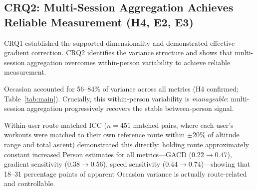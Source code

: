 \documentclass[times, twoside]{zHenriquesLab-StyleBioRxiv}
\begin{document}
\subsection*{CRQ2: Multi-Session Aggregation Achieves Reliable Measurement (H4, E2, E3)}

CRQ1 established the supported dimensionality and demonstrated effective gradient correction. CRQ2 identifies the variance structure and shows that multi-session aggregation overcomes within-person variability to achieve reliable measurement.

\begin{table}[ht]
\centering
\small
\caption{Reliability of DI and the GACD-derived metrics. $\beta_{\text{time}}$, $\beta_{\text{grad}}$, and $\beta_{\text{speed}}$ are derived from Eq.~\ref{eq:gacd}. All four rows are computed on the same high-engagement subset ($N = 2{,}297$ workouts, $K = 309$ users) and by the same code path, so that DI is compared with the GACD metrics on identical data. SB is the Spearman--Brown estimate at $k = 5$ aggregated sessions, not the split-half value. Route $CV\ R^2$ is within-person predictability from route features (Ridge, group $k$-fold CV); values at or below zero indicate that route geometry carries no recoverable information about the metric once person effects are removed. Speed sensitivity may carry endogeneity bias (see Discussion); gradient sensitivity is the preferred profiling metric.}
\label{tab:main}
\end{table}

Occasion accounted for 56--84\% of variance across all metrics (H4 confirmed; Table~\ref{tab:main}). Crucially, this within-person variability is \textit{manageable}: multi-session aggregation progressively recovers the stable between-person signal.

Within-user route-matched ICC ($n = 451$ matched pairs, where each user's workouts were matched to their own reference route within $\pm 20\%$ of altitude range and total ascent) demonstrated this directly: holding route approximately constant increased Person estimates for all metrics---GACD ($0.22 \rightarrow 0.47$), gradient sensitivity ($0.38 \rightarrow 0.56$), speed sensitivity ($0.44 \rightarrow 0.74$)---showing that 18--31 percentage points of apparent Occasion variance is actually route-related and controllable.
\end{document}
